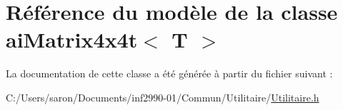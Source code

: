 \hypertarget{classai_matrix4x4t}{\section{Référence du modèle de la classe ai\-Matrix4x4t$<$ T $>$}
\label{classai_matrix4x4t}
}


La documentation de cette classe a été générée à partir du fichier suivant \-:\begin{DoxyCompactItemize}
\item 
C\-:/\-Users/saron/\-Documents/inf2990-\/01/\-Commun/\-Utilitaire/\hyperlink{_utilitaire_8h}{Utilitaire.\-h}\end{DoxyCompactItemize}
